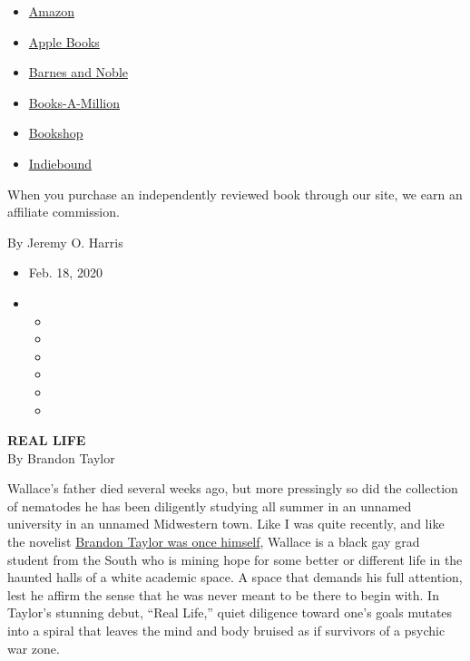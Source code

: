 \begin{itemize}
\tightlist
\item
  \href{https://www.amazon.com/gp/search?index=books\&tag=NYTBSREV-20\&field-keywords=Real+Life+Brandon+Taylor}{Amazon}
\item
  \href{https://du-gae-books-dot-nyt-du-prd.appspot.com/buy?title=Real+Life\&author=Brandon+Taylor}{Apple
  Books}
\item
  \href{https://www.anrdoezrs.net/click-7990613-11819508?url=https\%3A\%2F\%2Fwww.barnesandnoble.com\%2Fw\%2F\%3Fean\%3D9780525538882}{Barnes
  and Noble}
\item
  \href{https://www.anrdoezrs.net/click-7990613-35140?url=https\%3A\%2F\%2Fwww.booksamillion.com\%2Fp\%2FReal\%2BLife\%2FBrandon\%2BTaylor\%2F9780525538882}{Books-A-Million}
\item
  \href{https://bookshop.org/a/3546/9780525538882}{Bookshop}
\item
  \href{https://www.indiebound.org/book/9780525538882?aff=NYT}{Indiebound}
\end{itemize}

When you purchase an independently reviewed book through our site, we
earn an affiliate commission.

By Jeremy O. Harris

\begin{itemize}
\item
  Feb. 18, 2020
\item
  \begin{itemize}
  \item
  \item
  \item
  \item
  \item
  \item
  \end{itemize}
\end{itemize}

\textbf{REAL LIFE}\\
By Brandon Taylor

Wallace's father died several weeks ago, but more pressingly so did the
collection of nematodes he has been diligently studying all summer in an
unnamed university in an unnamed Midwestern town. Like I was quite
recently, and like the novelist
\href{https://www.nytimes.com/2020/02/10/books/brandon-taylor-real-life.html}{Brandon
Taylor was once himself}, Wallace is a black gay grad student from the
South who is mining hope for some better or different life in the
haunted halls of a white academic space. A space that demands his full
attention, lest he affirm the sense that he was never meant to be there
to begin with. In Taylor's stunning debut, ``Real Life,'' quiet
diligence toward one's goals mutates into a spiral that leaves the mind
and body bruised as if survivors of a psychic war zone.

